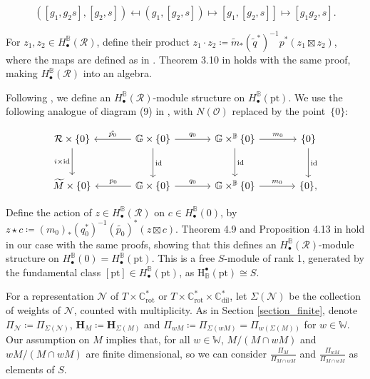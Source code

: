 \documentclass[11pt]{article}
\newcommand{\C}{\mathbb{C}}
\renewcommand{\O}{\mathcal{O}}
\newcommand{\R}{\mathcal{R}}
\renewcommand{\H}{\textbf{H}}
\newcommand{\bbG}{\mathbb{G}}
\newcommand{\bbB}{\mathbb{B}}
\newcommand{\1}{\mathbb{1}}
\newcommand{\tW}{\mathbb{W}}
\newcommand{\HBM}[2]{H_\bullet^{#1}(#2)}
\newcommand{\Crot}{\C^*_{\text{rot}}}
\newcommand{\Cdil}{\C^*_{\text{dil}}}
\newcommand{\tM}{\widetilde{M}}
\newcommand{\pt}{\text{pt}}
\theoremstyle{definition}
\numberwithin{equation}{section}
\begin{document}
$$([g_1, g_2 s], [g_2, s]) \mapsfrom (g_1, [g_2, s]) \mapsto [g_1, [g_2, s]] \mapsto [g_1 g_2, s].$$

For $z_1, z_2 \in \HBM{\bbB}{\R}$, define their product $z_1 \cdot z_2 \coloneqq \tilde{m}_* (\tilde{q}^*)^{-1} p^* (z_1\boxtimes z_2)$, where the maps are defined as in \cite[(3.7), Remark 3.8]{BFN}. Theorem 3.10 in \cite{BFN} holds with the same proof, making $\HBM{\bbB}{\R}$ into an algebra.

Following \cite[Theorem 4.9, .3]{HKW}, we define an $\HBM{\bbB}{\R}$-module structure on $\HBM{\bbB}{\pt}$. We use the following analogue of diagram (9) in \cite{HKW}, with $N(\O)$ replaced by the point~$\{0\}$:

\begin{equation}
\label{affine_diagram_0_module}
\begin{tikzcd}[column sep=large, row sep=large]
\mathcal{R} \times \{0\} \arrow[d, "i \times \text{id}"{left}] & \bbG \times \{ 0 \} \arrow[l, "\tilde{p_0}"{above}] \arrow[r, "q_0"] \arrow[d, "\text{id}"] & \bbG \times^{\bbB} \{ 0 \} \arrow[r, "m_0"] \arrow[d, "\text{id}"] & \{ 0 \} \arrow[d, "\text{id}"] \\
\tM \times \{ 0 \} & 
\bbG \times \{0\} \arrow[l, "p_0"{above}] \arrow[r, "q_0"{above}] & 
\bbG \times^\bbB \{ 0\} \arrow[r, "m_0"{above}] & 
\{ 0\},
\end{tikzcd}
\end{equation}

Define the action of $z\in \HBM{\bbB}{\R}$ on $c \in \HBM{\bbB}{0}$, by $z\star c \coloneqq (m_0)_* (q_0^*)^{-1}(\tilde{p_0})^*(z \boxtimes c)$. Theorem 4.9 and Proposition 4.13 in \cite{HKW} hold in our case with the same proofs, showing that this defines an $\HBM{\bbB}{\R}$-module structure on $\HBM{\bbB}{0} = \HBM{\bbB}{\pt}$. This is a free $S$-module of rank 1, generated by the fundamental class $[\pt] \in \HBM{\bbB}{\pt}$, as $\text{H}^\bullet_{\bbB}(\pt) \cong S$.

For a representation $\mathcal{N}$ of $T\times \Crot$ or $T\times \Crot\times \Cdil$, let $\Sigma(\mathcal{N})$ be the collection of weights of $\mathcal{N}$, counted with multiplicity. As in Section \ref{section_finite}, denote $\Pi_{\mathcal{N}} \coloneqq \Pi_{\Sigma(\mathcal{N})}$, $\H_M \coloneqq \H_{\Sigma(M)}$ and  $\Pi_{wM}\coloneqq  \Pi_{\Sigma(wM)}= \Pi_{w(\Sigma(M))}$ for $w\in \tW$. Our assumption on $M$ implies that, for all $w\in \tW$, $M/(M\cap wM)$ and $wM / (M \cap wM)$ are finite dimensional, so we can consider $\frac{\Pi_{M}}{\Pi_{M\cap wM}}$ and $\frac{\Pi_{wM}}{\Pi_{M\cap wM}}$ as elements of $S$.
\end{document}
